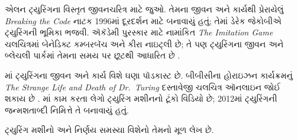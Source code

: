 \documentclass[../../../include/open-logic-section]{subfiles}
\begin{document}
\begin{reading}
એલન ટ્યુરિંગના
વિસ્તૃત જીવનચરિત્ર
માટે \citet{Hodges2014}
જુઓ. તેમના જીવન
અને કાર્યથી
પ્રેરાયેલું
\emph{Breaking the Code}
નાટક 1996માં
દૂરદર્શન માટે
બનાવાયું હતું;
તેમાં ડેરેક
જેકોબીએ ટ્યુરિંગની
ભૂમિકા ભજવી.
ઍકૅડેમી પુરસ્કાર
માટે નામાંકિત
\emph{The Imitation Game}
ચલચિત્રમાં બેનેડિક્ટ
કમ્બરબૅચ અને
કીરા નાઇટ્લી
છે; તે પણ
ટ્યુરિંગના જીવન
અને બ્લેચલી
પાર્કમાં તેમના
સમય પર છૂટથી
આધારિત છે
\citep{Imitation2014}.

\citet{Radiolab2012}માં
ટ્યુરિંગના જીવન
અને કાર્ય વિશે
ઘણા પૉડકાસ્ટ
છે. બીબીસીના
હોરાઇઝન કાર્યક્રમનું
\emph{The Strange Life and Death of
  Dr.~Turing}
દસ્તાવેજી ચલચિત્ર
ઑનલાઇન જોઈ શકાય
છે \citep{Sykes1992}.
\citep{Theelen2012}માં
કામ કરતા લેગો
ટ્યુરિંગ મશીનનો
ટૂંકો વિડિયો છે;
2012માં ટ્યુરિંગની
જન્મશતાબ્દી નિમિત્તે
તે બનાવાયું હતું.

ટ્યુરિંગ મશીનો
અને નિર્ણય સમસ્યા
વિશેનો તેમનો મૂળ
લેખ \citet{Turing1937}
છે.
\end{reading}
\end{document}
